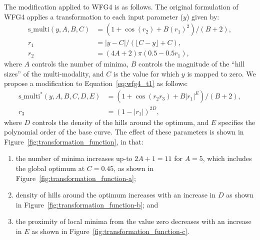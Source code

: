 \documentclass{llncs}
\begin{document}
The modification applied to WFG4 is as follows. The original formulation of WFG4 applies a transformation to each input parameter ($y$) given by:
\begin{equation}
\begin{aligned}
 \text{s\_multi}(y,A,B,C) &= \left(1+\cos(r_2) +B (r_1)^2  
 \right)/(B+2),\\
 r_1 &= |y-C| / (\lfloor C-y \rfloor +C ),\\
 r_2 &= (4A+2)\pi ( 0.5 - 0.5r_1 ),
 \label{eq:wfg4_t1}
\end{aligned}
 \end{equation}
where $A$ controls the number of minima, $B$ controls the magnitude of the ``hill sizes'' of the multi-modality, and $C$ is the value for which $y$ is mapped to zero. We propose a modification to Equation~\ref{eq:wfg4_t1} as follows:
\begin{equation}
\begin{aligned}
 \text{s\_multi}^*(y,A,B,C,D,E) &= \left( 1+\cos(r_2 r_3) +B|r_1|^E  \right)/(B+2),\\
 r_3 &= (1-|r_1|)^{2D},
\end{aligned}
 \label{eq:wfg4_t1_mod}
\end{equation}
where $D$ controls the density of the hills around the optimum, and $E$ specifies the polynomial order of the base curve. The effect of these parameters is shown in Figure~\ref{fig:transformation_function}, in that:
\begin{enumerate}
 \item the number of minima increases up-to $2A+1=11$ for $A=5$, which includes the global optimum at $C=0.45$, as shown in Figure~\ref{fig:transformation_function-a};
 \item density of hills around the optimum increases with an increase in $D$ as shown in Figure~\ref{fig:transformation_function-b}; and
 \item the proximity of local minima from the value zero decreases with an increase in $E$ as shown in Figure~\ref{fig:transformation_function-c}.
\end{enumerate}
\end{document}
